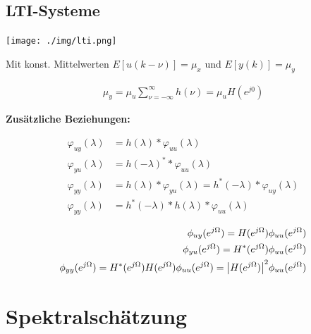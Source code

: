 \documentclass[10pt,a4paper]{article}
\begin{document}
\subsection{LTI-Systeme}
  \begin{center}
      \texttt{[image: ./img/lti.png]}
  \end{center}
Mit konst. Mittelwerten $E[u(k-\nu)]=\mu_x$ und $E[y(k)]=\mu_y$
  \begin{mdframed}[style=exercise]
    \begin{align}
        \mu_y = \mu_u \sum_{\nu=-\infty}^{\infty} h(\nu) = \mu_u H(e^{j0})
    \end{align}
  \end{mdframed}
\textbf{Zusätzliche Beziehungen:}
  \begin{mdframed}[style=exercise]
    \begin{align}
        \varphi_{uy}(\lambda) &= h(\lambda)*\varphi_{uu}(\lambda) \\
        \varphi_{yu}(\lambda) &= h(-\lambda)^**\varphi_{uu}(\lambda) \\
        \varphi_{yy}(\lambda) &= h(\lambda)*\varphi_{yu}(\lambda) = h^*(-\lambda)*\varphi_{uy}(\lambda) \\
        \varphi_{yy}(\lambda) &= h^*(-\lambda)*h(\lambda)*\varphi_{uu}(\lambda)
    \end{align}
  \end{mdframed}

\begin{mdframed}[style=exercise]
    \begin{align}
      \phi_{uy}(e^{j\Omega}) = H(e^{j\Omega})\phi_{uu}(e^{j\Omega})\\
      \phi_{yu}(e^{j\Omega}) = H^*(e^{j\Omega})\phi_{uu}(e^{j\Omega})\\
      \phi_{yy}(e^{j\Omega}) = H^*(e^{j\Omega})H(e^{j\Omega})\phi_{uu}(e^{j\Omega}) =\abs{H(e^{j\Omega})}^2 \phi_{uu}(e^{j\Omega})
    \end{align}
\end{mdframed}

  
  \section{Spektralschätzung}
\end{document}
